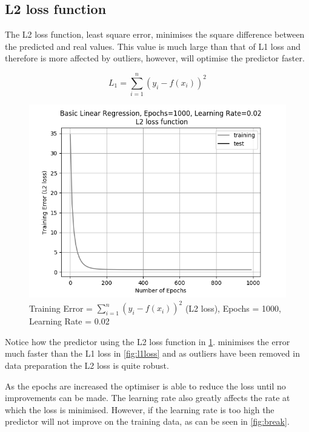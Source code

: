 \documentclass[10pt,twocolumn,letterpaper]{article}
\begin{document}
\subsection{L2 loss function}
The L2 loss function, least square error, minimises the square difference between the predicted and real values. This value is much large than that of L1 loss and therefore is more affected by outliers, however, will optimise the predictor faster.

\begin{equation}
L_1 = \sum_{i = 1}^{n} (y_i - f(x_i))^2
\end{equation}

\begin{figure}[h]
	\begin{center}
		\includegraphics[width=0.9\linewidth]{img/l2loss.png}
	\end{center}
	\caption{Training Error = $\sum_{i = 1}^{n} (y_i - f(x_i))^2$ (L2 loss), Epochs = 1000, Learning Rate = 0.02}
	\label{fig:l2loss}
\end{figure}

Notice how the predictor using the L2 loss function in \ref{fig:l2loss}. minimises the error much faster than the L1 loss in \ref{fig:l1loss} and as outliers have been removed in data preparation the L2 loss is quite robust.

As the epochs are increased the optimiser is able to reduce the loss until no improvements can be made. The learning rate also greatly affects the rate at which the loss is minimised. However, if the learning rate is too high the predictor will not improve on the training data, as can be seen in \ref{fig:break}.
\end{document}
